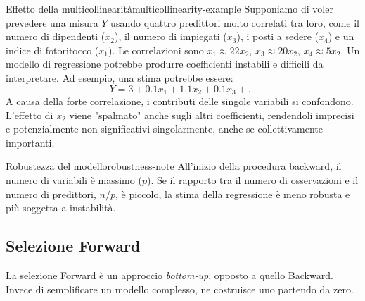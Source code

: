 \begin{esempio}{Effetto della multicollinearità}{multicollinearity-example}
Supponiamo di voler prevedere una misura \(Y\) usando quattro predittori molto
correlati tra loro, come il numero di dipendenti (\(x_2\)), il numero di
impiegati (\(x_3\)), i posti a sedere (\(x_4\)) e un indice di fotoritocco
(\(x_1\)). Le correlazioni sono \(x_1 \approx 22x_2\), \(x_3 \approx 20x_2\),
\(x_4 \approx 5x_2\).
Un modello di regressione potrebbe produrre coefficienti instabili e difficili
da interpretare. Ad esempio, una stima potrebbe essere:
\[ Y = 3 + 0.1x_1 + 1.1x_2 + 0.1x_3 + \dots \]
A causa della forte correlazione, i contributi delle singole variabili si
confondono. L'effetto di \(x_2\) viene "spalmato" anche sugli altri
coefficienti, rendendoli imprecisi e potenzialmente non significativi
singolarmente, anche se collettivamente importanti.
\end{esempio}

\begin{nota}{Robustezza del modello}{robustness-note}
All'inizio della procedura backward, il numero di variabili è massimo (\(p\)).
Se il rapporto tra il numero di osservazioni e il numero di predittori, \(n/p\),
è piccolo, la stima della regressione è meno robusta e più soggetta a
instabilità.
\end{nota}

\subsection{Selezione Forward}

La selezione Forward è un approccio \textit{bottom-up}, opposto a quello
Backward. Invece di semplificare un modello complesso, ne costruisce uno
partendo da zero.

